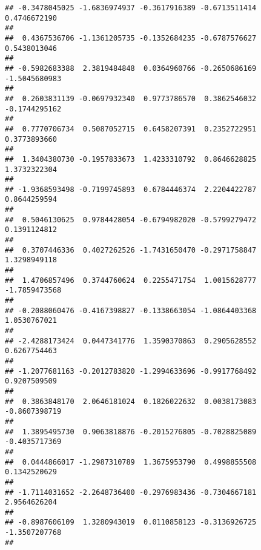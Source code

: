 \documentclass[]{article}
\begin{document}
\begin{verbatim}
## -0.3478045025 -1.6836974937 -0.3617916389 -0.6713511414  0.4746672190 
##                                                                       
##  0.4367536706 -1.1361205735 -0.1352684235 -0.6787576627  0.5438013046 
##                                                                       
## -0.5982683388  2.3819484848  0.0364960766 -0.2650686169 -1.5045680983 
##                                                                       
##  0.2603831139 -0.0697932340  0.9773786570  0.3862546032 -0.1744295162 
##                                                                       
##  0.7770706734  0.5087052715  0.6458207391  0.2352722951  0.3773893660 
##                                                                       
##  1.3404380730 -0.1957833673  1.4233310792  0.8646628825  1.3732322304 
##                                                                       
## -1.9368593498 -0.7199745893  0.6784446374  2.2204422787  0.8644259594 
##                                                                       
##  0.5046130625  0.9784428054 -0.6794982020 -0.5799279472  0.1391124812 
##                                                                       
##  0.3707446336  0.4027262526 -1.7431650470 -0.2971758847  1.3298949118 
##                                                                       
##  1.4706857496  0.3744760624  0.2255471754  1.0015628777 -1.7859473568 
##                                                                       
## -0.2088060476 -0.4167398827 -0.1338663054 -1.0864403368  1.0530767021 
##                                                                       
## -2.4288173424  0.0447341776  1.3590370863  0.2905628552  0.6267754463 
##                                                                       
## -1.2077681163 -0.2012783820 -1.2994633696 -0.9917768492  0.9207509509 
##                                                                       
##  0.3863848170  2.0646181024  0.1826022632  0.0038173083 -0.8607398719 
##                                                                       
##  1.3895495730  0.9063818876 -0.2015276805 -0.7028825089 -0.4035717369 
##                                                                       
##  0.0444866017 -1.2987310789  1.3675953790  0.4998855508  0.1342520629 
##                                                                       
## -1.7114031652 -2.2648736400 -0.2976983436 -0.7304667181  2.9564626204 
##                                                                       
## -0.8987606109  1.3280943019  0.0110858123 -0.3136926725 -1.3507207768 
##                                                                       

\end{verbatim}
\end{document}

